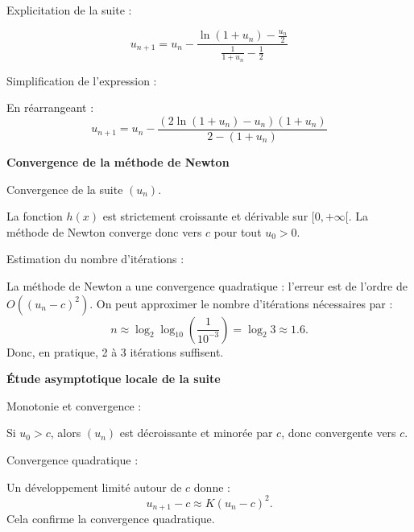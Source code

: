 \documentclass[10pt,a4paper]{article}
\begin{document}

\q Explicitation de la suite :

\[
 u_{n+1} = u_n - \frac{\ln(1+u_n) - \frac{u_n}{2}}{\frac{1}{1+u_n} - \frac{1}{2}}
\]


\q Simplification de l'expression :

En réarrangeant :
\[
 u_{n+1} = u_n - \frac{(2\ln(1+u_n) - u_n)(1+u_n)}{2 - (1+u_n)}
\]

\bigskip
\textbf{Convergence de la méthode de Newton}

\q Convergence de la suite \( (u_n) \).

La fonction \( h(x) \) est strictement croissante et dérivable sur \( [0, +\infty[ \). La méthode de
Newton converge donc vers \( c \) pour tout \( u_0 > 0 \).


\q Estimation du nombre d'itérations :

La méthode de Newton a une convergence quadratique : l'erreur est de l'ordre de \( O((u_n - c)^2)
\). On peut approximer le nombre d'itérations nécessaires par :
\[
 n \approx \log_2 \log_{10}(\frac{1}{10^{-3}}) = \log_2 3 \approx 1.6.
\]
Donc, en pratique, 2 à 3 itérations suffisent.

\bigskip
\textbf{Étude asymptotique locale de la suite}

\q Monotonie et convergence :

Si \( u_0 > c \), alors \( (u_n) \) est décroissante et minorée par \( c \), donc convergente vers
\( c \).


\q Convergence quadratique :

Un développement limité autour de \( c \) donne :
\[
 u_{n+1} - c \approx K (u_n - c)^2.
\]
Cela confirme la convergence quadratique.
\end{document}
